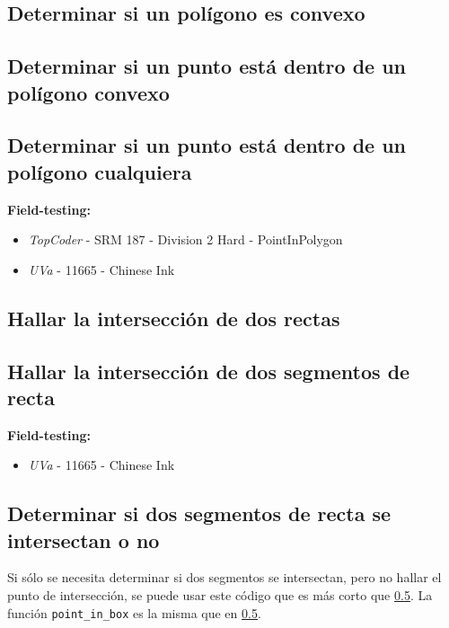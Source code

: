 \documentclass[10pt,letterpaper,twocolumn]{article}
\newcommand{\codigofuente}[1]{

\dotfill
}
\begin{document}
\subsection{Determinar si un polígono es convexo}
\codigofuente{./src/geometria/is_convex_polygon.cpp}

\subsection{Determinar si un punto está dentro de un polígono convexo}
\codigofuente{./src/geometria/is_inside_convex_polygon.cpp}

\subsection{Determinar si un punto está dentro de un polígono cualquiera}
\small
\textbf{Field-testing:}
\begin{itemize}
\item \emph{TopCoder} -  SRM 187 - Division 2 Hard - PointInPolygon
\item \emph{UVa} - 11665 - Chinese Ink
\end{itemize}
\normalsize
\codigofuente{./src/geometria/is_inside_concave_polygon.cpp}

\subsection{Hallar la intersección de dos rectas}
\codigofuente{./src/geometria/line_line_intersection.cpp}

\subsection{Hallar la intersección de dos segmentos de recta}
\label{hallar_interseccion_segmentos}
\small
\textbf{Field-testing:}
\begin{itemize}
\item \emph{UVa} - 11665 - Chinese Ink
\end{itemize}
\normalsize

\codigofuente{./src/geometria/segment_segment_intersection.cpp}

\subsection{Determinar si dos segmentos de recta se intersectan o no}

Si sólo se necesita determinar si dos segmentos se intersectan, pero no hallar
el punto de intersección, se puede usar este código que es más corto que \ref{hallar_interseccion_segmentos}.
La función \verb!point_in_box! es la misma que en \ref{hallar_interseccion_segmentos}.
\end{document}
